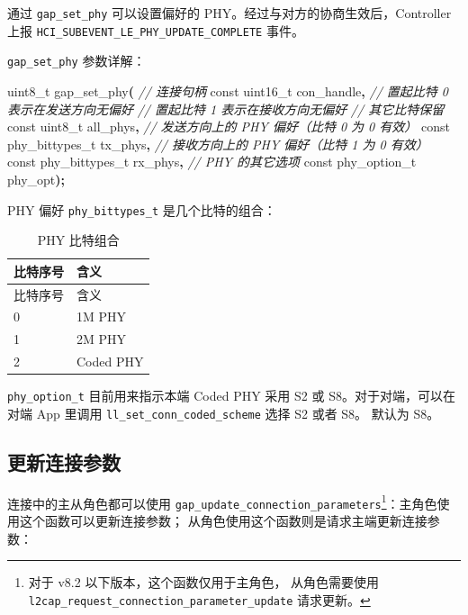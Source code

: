 \documentclass[
  12pt,
]{book}
\newenvironment{Shaded}{\begin{snugshade}}{\end{snugshade}}
\newcommand{\CommentTok}[1]{\textcolor[rgb]{0.56,0.35,0.01}{\textit{#1}}}
\newcommand{\DataTypeTok}[1]{\textcolor[rgb]{0.13,0.29,0.53}{#1}}
\newcommand{\NormalTok}[1]{#1}
\newcommand{\OperatorTok}[1]{\textcolor[rgb]{0.81,0.36,0.00}{\textbf{#1}}}
\begin{document}
通过 \texttt{gap\_set\_phy} 可以设置偏好的 PHY。经过与对方的协商生效后，Controller 上报 \texttt{HCI\_SUBEVENT\_LE\_PHY\_UPDATE\_COMPLETE} 事件。

\texttt{gap\_set\_phy} 参数详解：

\begin{Shaded}
\begin{Highlighting}[]
\DataTypeTok{uint8\_t}\NormalTok{ gap\_set\_phy}\OperatorTok{(}
  \CommentTok{// 连接句柄}
  \DataTypeTok{const} \DataTypeTok{uint16\_t}\NormalTok{ con\_handle}\OperatorTok{,}
  \CommentTok{// 置起比特 0 表示在发送方向无偏好}
  \CommentTok{// 置起比特 1 表示在接收方向无偏好}
  \CommentTok{// 其它比特保留}
  \DataTypeTok{const} \DataTypeTok{uint8\_t}\NormalTok{ all\_phys}\OperatorTok{,}
  \CommentTok{// 发送方向上的 PHY 偏好（比特 0 为 0 有效）}
  \DataTypeTok{const}\NormalTok{ phy\_bittypes\_t tx\_phys}\OperatorTok{,}
  \CommentTok{// 接收方向上的 PHY 偏好（比特 1 为 0 有效）}
  \DataTypeTok{const}\NormalTok{ phy\_bittypes\_t rx\_phys}\OperatorTok{,}
  \CommentTok{// PHY 的其它选项}
  \DataTypeTok{const}\NormalTok{ phy\_option\_t phy\_opt}\OperatorTok{);}
\end{Highlighting}
\end{Shaded}

PHY 偏好 \texttt{phy\_bittypes\_t} 是几个比特的组合：

\begin{longtable}[]{@{}ll@{}}
\caption{\label{tab:ch2-phy-bit-types} PHY 比特组合}\tabularnewline
\toprule()
比特序号 & 含义 \\
\midrule()
\endfirsthead
\toprule()
比特序号 & 含义 \\
\midrule()
\endhead
0 & 1M PHY \\
1 & 2M PHY \\
2 & Coded PHY \\
\bottomrule()
\end{longtable}

\texttt{phy\_option\_t} 目前用来指示本端 Coded PHY 采用 S2 或 S8。对于对端，可以在对端 App 里调用 \texttt{ll\_set\_conn\_coded\_scheme} 选择 S2 或者 S8。
默认为 S8。

\hypertarget{ux66f4ux65b0ux8fdeux63a5ux53c2ux6570}{%
\subsection{更新连接参数}\label{ux66f4ux65b0ux8fdeux63a5ux53c2ux6570}}

连接中的主从角色都可以使用 \texttt{gap\_update\_connection\_parameters}\footnote{对于 v8.2 以下版本，这个函数仅用于主角色，
  从角色需要使用 \texttt{l2cap\_request\_connection\_parameter\_update} 请求更新。}：主角色使用这个函数可以更新连接参数；
从角色使用这个函数则是请求主端更新连接参数：
\end{document}
